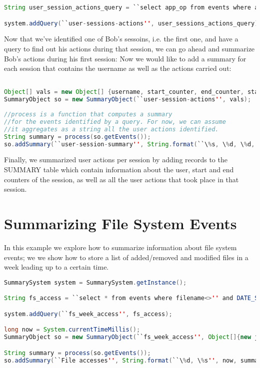 \begin{lstlisting}[language=Java]
String user_session_actions_query = ``select app_op from events where app_op like 'mint-user-\%' and app_arg[0] = ? and event_counter > ? and event_counter < ?'';

system.addQuery(``user-sessions-actions'', user_sessions_actions_query);
\end{lstlisting}

\noindent
Now that we've identified one of Bob's sessoins, i.e. the first one, and have a query to find out his actions during that session, we can go ahead and summarize Bob's actions during his first session:
Now we would like to add a summary for each session that contains the username as well as the actions carried out:

\begin{lstlisting}[language=Java]

Object[] vals = new Object[] {username, start_counter, end_counter, start_time, end_time};
SummaryObject so = new SummaryObject(``user-session-actions'', vals);
  
//process is a function that computes a summary
//for the events identified by a query. For now, we can assume
//it aggregates as a string all the user actions identified.
String summary = process(so.getEvents());
so.addSummary(``user-session-summary'', String.format(``\%s, \%d, \%d, \%s, \%s'', username, start_counter, end_counter, summary, start_time, end_time));

\end{lstlisting}

\noindent
Finally, we summarized user actions per session by adding records to the SUMMARY table which contain information about the user, start and end counters of the session, as well as all the user actions that took place in that session.

\section{Summarizing File System Events}
\label{sum:fs}
In this example we explore how to summarize information about file system events; we we show how to store a list of added/removed and modified files in a week leading up to a certain time.

\begin{lstlisting}[language=Java]
SummarySystem system = SummarySystem.getInstance();

String fs_access = ``select * from events where filename<>'' and DATE_SUB(?, INTERVAL 7 DAY)'';

system.addQuery(``fs_week_access'', fs_access);

long now = System.currentTimeMillis();
SummaryObject so = new SummaryObject(``fs_week_access'', Object[]{new java.sql.Timestamp(now)});

String summary = process(so.getEvents());
so.addSummary(``File accesses'', String.format(``\%d, \%s'', now, summary));
\end{lstlisting}

